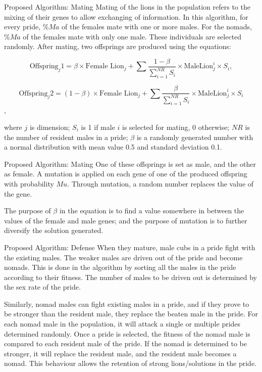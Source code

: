 \documentclass{beamer}
\begin{document}
\begin{frame}{Proposed Algorithm: Mating}
Mating of the lions in the population refers to the mixing of their genes to allow exchanging of information. In this algorithm, for every pride, $\%Ma$ of the females mate with one or more males. For the nomads, $\%Ma$ of the females mate with only one male. These individuals are selected randomly. After mating, two offsprings are produced using the equations:

\small
$$\text{Offspring}_j\text{1}=\beta \times \text{Female Lion}_j +\sum\frac{1-\beta}{\sum_{i=1}^{NR}S_i}\times\text{MaleLion}_j^i\times S_i,$$

$$\text{Offspring}_j\text{2}=(1-\beta) \times \text{Female Lion}_j +\sum\frac{\beta}{\sum_{i=1}^{NR}S_i}\times\text{MaleLion}_j^i\times S_i$$,

\normalsize
where $j$ is dimension; $S_i$ is 1 if male $i$ is selected for mating, 0 otherwise; $NR$ is the number of resident males in a pride; $\beta$ is a randomly generated number with a normal distribution with mean value 0.5 and standard deviation 0.1.
\end{frame}

\begin{frame}{Proposed Algorithm: Mating}
One of these offsprings is set as male, and the other as female. A mutation is applied on each gene of one of the produced offspring with probability $Mu$. Through mutation, a random number replaces the value of the gene.

The purpose of $\beta$ in the equation is to find a value somewhere in between the values of the female and male genes; and the purpose of mutation is to further diversify the solution generated.
\end{frame}

\begin{frame}{Proposed Algorithm: Defense}
When they mature, male cubs in a pride fight with the existing males. The weaker males are driven out of the pride and become nomads. This is done in the algorithm by sorting all the males in the pride according to their fitness. The number of males to be driven out is determined by the sex rate of the pride.

Similarly, nomad males can fight existing males in a pride, and if they prove to be stronger than the resident male, they replace the beaten male in the pride. For each nomad male in the population, it will attack a single or multiple prides determined randomly. Once a pride is selected, the fitness of the nomad male is compared to each resident male of the pride. If the nomad is determined to be stronger, it will replace the resident male, and the resident male becomes a nomad. This behaviour allows the retention of strong lions/solutions in the pride.
\end{frame}
\end{document}
